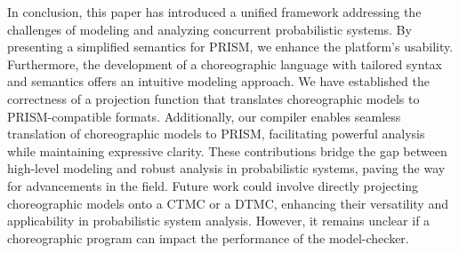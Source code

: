 In conclusion, this paper has introduced a unified framework addressing the challenges of modeling and analyzing concurrent probabilistic systems. By presenting a simplified semantics for PRISM, we enhance the platform's usability. Furthermore, the development of a choreographic language with tailored syntax and semantics offers an intuitive modeling approach. We have established the correctness of a projection function that translates choreographic models to PRISM-compatible formats. Additionally, our compiler enables seamless translation of choreographic models to PRISM, facilitating powerful analysis while maintaining expressive clarity. These contributions bridge the gap between high-level modeling and robust analysis in probabilistic systems, paving the way for advancements in the field. Future work could involve directly projecting choreographic models onto a CTMC or a DTMC, enhancing their versatility and applicability in probabilistic system analysis. However, it remains unclear if a choreographic program can impact the performance of the model-checker.

